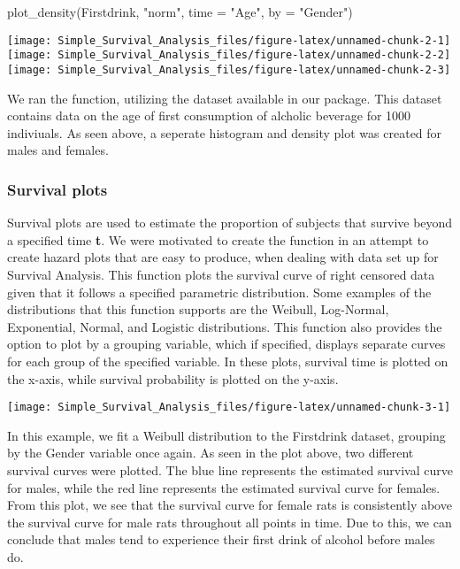 \begin{Schunk}
\begin{Sinput}
plot_density(Firstdrink, "norm", time = "Age", by = "Gender")
\end{Sinput}

\texttt{[image: Simple\_Survival\_Analysis\_files/figure-latex/unnamed-chunk-2-1]} 
\texttt{[image: Simple\_Survival\_Analysis\_files/figure-latex/unnamed-chunk-2-2]} 
\texttt{[image: Simple\_Survival\_Analysis\_files/figure-latex/unnamed-chunk-2-3]} \end{Schunk}

We ran the  function, utilizing the
 dataset available in our package. This dataset
contains data on the age of first consumption of alcholic beverage for
1000 indiviuals. As seen above, a seperate histogram and density plot
was created for males and females.

\hypertarget{survival-plots}{%
\subsubsection{Survival plots}\label{survival-plots}}

Survival plots are used to estimate the proportion of subjects that
survive beyond a specified time \textbf{t}. We were motivated to create
the function  in an attempt to create hazard plots that
are easy to produce, when dealing with data set up for Survival
Analysis. This function plots the survival curve of right censored data
given that it follows a specified parametric distribution. Some examples
of the distributions that this function supports are the Weibull,
Log-Normal, Exponential, Normal, and Logistic distributions. This
function also provides the option to plot by a grouping variable, which
if specified, displays separate curves for each group of the specified
variable. In these plots, survival time is plotted on the x-axis, while
survival probability is plotted on the y-axis.

\begin{Schunk}

\texttt{[image: Simple\_Survival\_Analysis\_files/figure-latex/unnamed-chunk-3-1]} \end{Schunk}

In this example, we fit a Weibull distribution to the Firstdrink
dataset, grouping by the Gender variable once again. As seen in the plot
above, two different survival curves were plotted. The blue line
represents the estimated survival curve for males, while the red line
represents the estimated survival curve for females. From this plot, we
see that the survival curve for female rats is consistently above the
survival curve for male rats throughout all points in time. Due to this,
we can conclude that males tend to experience their first drink of
alcohol before males do.

